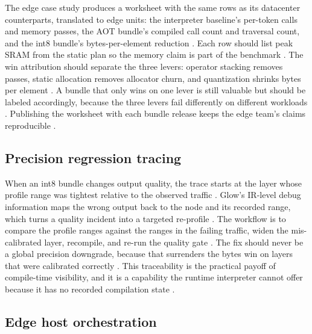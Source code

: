 The edge case study produces a worksheet with the same rows as its datacenter counterparts, translated to edge units: the interpreter baseline's per-token calls and memory passes, the AOT bundle's compiled call count and traversal count, and the int8 bundle's bytes-per-element reduction \citep{rotem2018glow,taxbreak2026,memoryfloor2026}. Each row should list peak SRAM from the static plan so the memory claim is part of the benchmark \citep{dlbook,patel2025llminference}. The win attribution should separate the three levers: operator stacking removes passes, static allocation removes allocator churn, and quantization shrinks bytes per element \citep{rotem2018glow,memoryfloor2026}. A bundle that only wins on one lever is still valuable but should be labeled accordingly, because the three levers fail differently on different workloads \citep{chen2020compilerbasedhardw,patel2025llminference}. Publishing the worksheet with each bundle release keeps the edge team's claims reproducible \citep{taxbreak2026,rotem2018glow}.

\subsection{Precision regression tracing}

When an int8 bundle changes output quality, the trace starts at the layer whose profile range was tightest relative to the observed traffic \citep{rotem2018glow,patel2025llminference}. Glow's IR-level debug information maps the wrong output back to the node and its recorded range, which turns a quality incident into a targeted re-profile \citep{pytorchglow2024,rotem2018glow}. The workflow is to compare the profile ranges against the ranges in the failing traffic, widen the mis-calibrated layer, recompile, and re-run the quality gate \citep{chen2020compilerbasedhardw,patel2025llminference}. The fix should never be a global precision downgrade, because that surrenders the bytes win on layers that were calibrated correctly \citep{memoryfloor2026,taxbreak2026}. This traceability is the practical payoff of compile-time visibility, and it is a capability the runtime interpreter cannot offer because it has no recorded compilation state \citep{rotem2018glow,memoryfloor2026}.

\subsection{Edge host orchestration}

